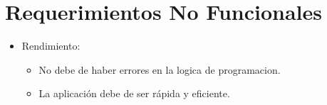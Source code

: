 \section{Requerimientos No Funcionales}
\begin{itemize}
  \item Rendimiento:
    \begin{itemize}
      \item No debe de haber errores en la logica de programacion.
      \item La aplicación debe de ser rápida y eficiente.
    \end{itemize}
\end{itemize}
